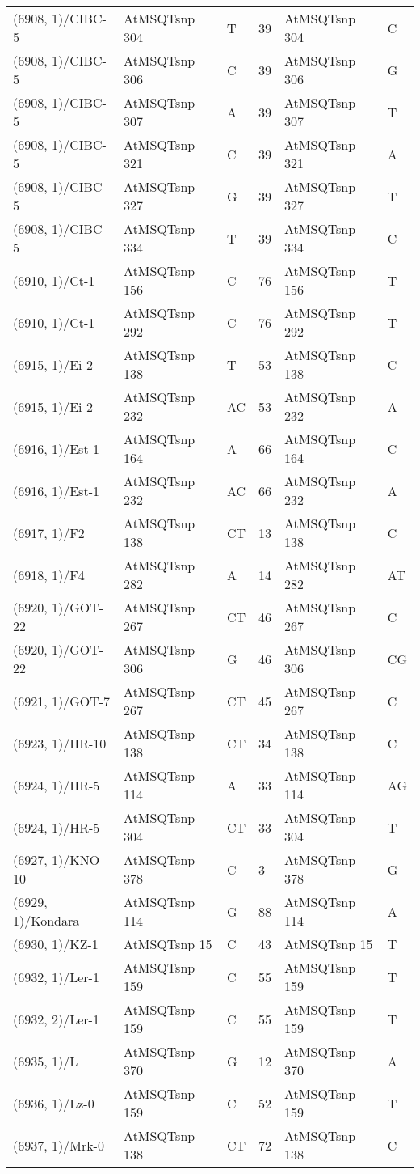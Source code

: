 \begin{center}
\begin{longtable}{|l|l|l|l|l|l|}
(6908, 1)/CIBC-5&AtMSQTsnp 304&T&39&AtMSQTsnp 304&C\\
(6908, 1)/CIBC-5&AtMSQTsnp 306&C&39&AtMSQTsnp 306&G\\
(6908, 1)/CIBC-5&AtMSQTsnp 307&A&39&AtMSQTsnp 307&T\\
(6908, 1)/CIBC-5&AtMSQTsnp 321&C&39&AtMSQTsnp 321&A\\
(6908, 1)/CIBC-5&AtMSQTsnp 327&G&39&AtMSQTsnp 327&T\\
(6908, 1)/CIBC-5&AtMSQTsnp 334&T&39&AtMSQTsnp 334&C\\
(6910, 1)/Ct-1&AtMSQTsnp 156&C&76&AtMSQTsnp 156&T\\
(6910, 1)/Ct-1&AtMSQTsnp 292&C&76&AtMSQTsnp 292&T\\
(6915, 1)/Ei-2&AtMSQTsnp 138&T&53&AtMSQTsnp 138&C\\
(6915, 1)/Ei-2&AtMSQTsnp 232&AC&53&AtMSQTsnp 232&A\\
(6916, 1)/Est-1&AtMSQTsnp 164&A&66&AtMSQTsnp 164&C\\
(6916, 1)/Est-1&AtMSQTsnp 232&AC&66&AtMSQTsnp 232&A\\
(6917, 1)/F2&AtMSQTsnp 138&CT&13&AtMSQTsnp 138&C\\
(6918, 1)/F4&AtMSQTsnp 282&A&14&AtMSQTsnp 282&AT\\
(6920, 1)/GOT-22&AtMSQTsnp 267&CT&46&AtMSQTsnp 267&C\\
(6920, 1)/GOT-22&AtMSQTsnp 306&G&46&AtMSQTsnp 306&CG\\
(6921, 1)/GOT-7&AtMSQTsnp 267&CT&45&AtMSQTsnp 267&C\\
(6923, 1)/HR-10&AtMSQTsnp 138&CT&34&AtMSQTsnp 138&C\\
(6924, 1)/HR-5&AtMSQTsnp 114&A&33&AtMSQTsnp 114&AG\\
(6924, 1)/HR-5&AtMSQTsnp 304&CT&33&AtMSQTsnp 304&T\\
(6927, 1)/KNO-10&AtMSQTsnp 378&C&3&AtMSQTsnp 378&G\\
(6929, 1)/Kondara&AtMSQTsnp 114&G&88&AtMSQTsnp 114&A\\
(6930, 1)/KZ-1&AtMSQTsnp 15&C&43&AtMSQTsnp 15&T\\
(6932, 1)/Ler-1&AtMSQTsnp 159&C&55&AtMSQTsnp 159&T\\
(6932, 2)/Ler-1&AtMSQTsnp 159&C&55&AtMSQTsnp 159&T\\
(6935, 1)/L&AtMSQTsnp 370&G&12&AtMSQTsnp 370&A\\
(6936, 1)/Lz-0&AtMSQTsnp 159&C&52&AtMSQTsnp 159&T\\
(6937, 1)/Mrk-0&AtMSQTsnp 138&CT&72&AtMSQTsnp 138&C\\

\end{longtable}
\end{center}
